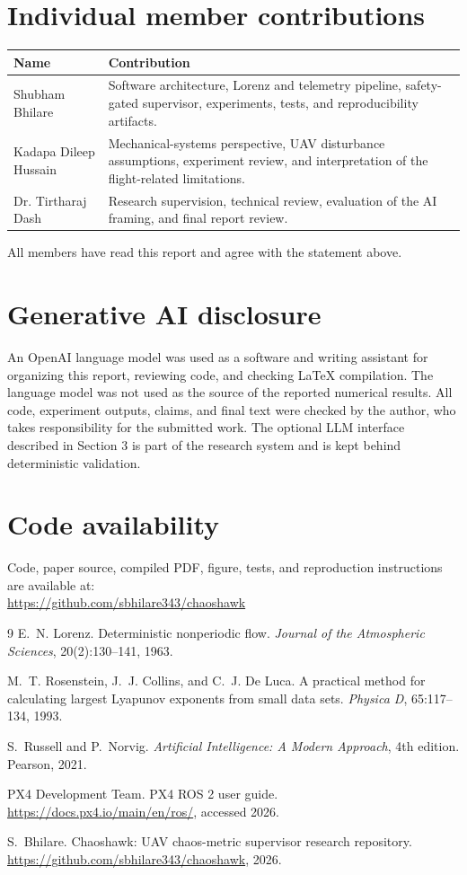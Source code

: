 \documentclass[11pt,a4paper,twocolumn]{article}
\newcommand{\githuburl}{https://github.com/sbhilare343/chaoshawk}
\begin{document}
\section*{Individual member contributions}
\small
\begin{tabularx}{\linewidth}{@{}l X@{}}
\toprule
Name & Contribution \\
\midrule
Shubham Bhilare & Software architecture, Lorenz and telemetry pipeline, safety-gated supervisor, experiments, tests, and reproducibility artifacts. \\
Kadapa Dileep Hussain & Mechanical-systems perspective, UAV disturbance assumptions, experiment review, and interpretation of the flight-related limitations. \\
Dr. Tirtharaj Dash & Research supervision, technical review, evaluation of the AI framing, and final report review. \\
\bottomrule
\end{tabularx}

\smallskip
\noindent All members have read this report and agree with the statement above.

\section*{Generative AI disclosure}
An OpenAI language model was used as a software and writing assistant for
organizing this report, reviewing code, and checking LaTeX compilation. The
language model was not used as the source of the reported numerical results.
All code, experiment outputs, claims, and final text were checked by the
author, who takes responsibility for the submitted work. The optional LLM
interface described in Section 3 is part of the research system and is kept
behind deterministic validation.

\section*{Code availability}
Code, paper source, compiled PDF, figure, tests, and reproduction instructions
are available at:\\
\url{\githuburl}

\begin{thebibliography}{9}
\small
{}
E.~N. Lorenz.
\newblock Deterministic nonperiodic flow.
\newblock \emph{Journal of the Atmospheric Sciences}, 20(2):130--141, 1963.

M.~T. Rosenstein, J.~J. Collins, and C.~J. De Luca.
\newblock A practical method for calculating largest Lyapunov exponents from
small data sets.
\newblock \emph{Physica D}, 65:117--134, 1993.

S.~Russell and P.~Norvig.
\newblock \emph{Artificial Intelligence: A Modern Approach}, 4th edition.
\newblock Pearson, 2021.

PX4 Development Team.
\newblock PX4 ROS 2 user guide.
\newblock \url{https://docs.px4.io/main/en/ros/}, accessed 2026.

S.~Bhilare.
\newblock Chaoshawk: UAV chaos-metric supervisor research repository.
\newblock \url{\githuburl}, 2026.
\end{thebibliography}
\end{document}

